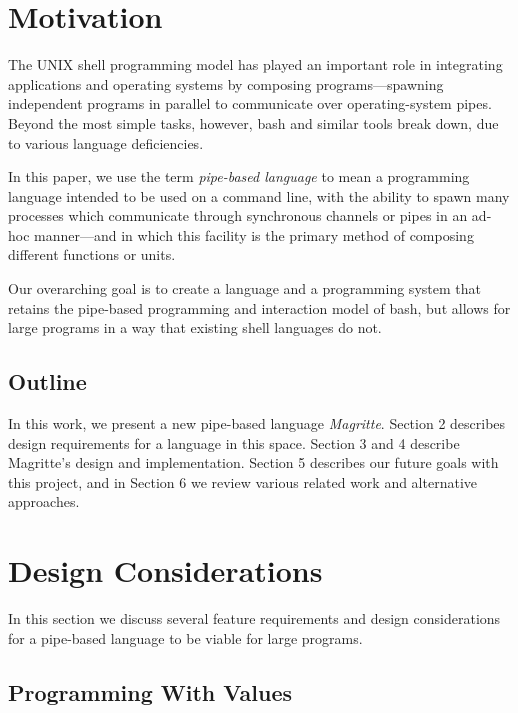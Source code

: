 \ifsigpro{ \documentclass[english,PRO]{ipsj} }
\begin{document}
\maketitle

\section{Motivation}\label{motivation}

\noindent
The UNIX shell programming model has played an important role in integrating applications and operating systems by composing programs---spawning independent programs in parallel to communicate over operating-system pipes. Beyond the most simple tasks, however, bash and similar tools break down, due to various language deficiencies.

In this paper, we use the term \emph{pipe-based language} to mean a programming language intended to be used on a command line, with the ability to spawn many processes which communicate through synchronous channels or pipes in an ad-hoc manner---and in which this facility is the primary method of composing different functions or units.

Our overarching goal is to create a language and a programming system that retains the pipe-based programming and interaction model of bash, but allows for large programs in a way that existing shell languages do not.

\subsection*{Outline}\noindent
In this work, we present a new pipe-based language \emph{Magritte}. Section 2 describes design requirements for a language in this space. Section 3 and 4 describe Magritte's design and implementation. Section 5 describes our future goals with this project, and in Section 6 we review various related work and alternative approaches.

\section{Design Considerations}\label{design-considerations}\noindent
In this section we discuss several feature requirements and design considerations for a pipe-based language to be viable for large programs.

\subsection{Programming With Values}
\end{document}

